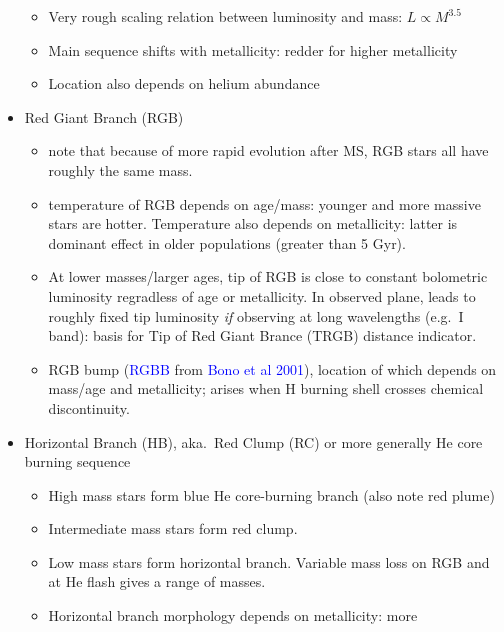 \documentclass{article}
\begin{document}
\begin{itemize}
        \begin{itemize}
            \item Very rough scaling relation between luminosity and mass:
                $ L \propto M^{3.5} $
            \item Main sequence shifts with metallicity: redder for
                higher metallicity
            \item Location also depends on helium abundance
        \end{itemize}
    \item Red Giant Branch (RGB)
        \begin{itemize}
            \item note that because of more rapid evolution after MS,
                RGB stars all have roughly the same mass.
            \item temperature of RGB depends on age/mass: younger and more
                massive stars are hotter. Temperature also depends on
                metallicity: latter is dominant effect in older populations
                (greater than 5 Gyr).
            \item At lower masses/larger ages, tip of RGB is close to
                constant bolometric luminosity regradless of age or
                metallicity. In observed plane, leads to roughly fixed
                tip luminosity \emph{if} observing at long wavelengths
                (e.g.\ I band): basis for Tip of Red Giant Brance (TRGB)
                distance indicator.
            \item RGB bump (\textcolor{blue}{RGBB} from
                \textcolor{blue}{Bono et al 2001}),
                location of which depends on mass/age and metallicity;
                arises when H burning shell crosses chemical discontinuity.
        \end{itemize}
    \item Horizontal Branch (HB), aka.\ Red Clump (RC) or more generally
        He core burning sequence
        \begin{itemize}
            \item High mass stars form blue He core-burning branch
                (also note red plume)
            \item Intermediate mass stars form red clump.
            \item Low mass stars form horizontal branch. Variable mass loss
                on RGB and at He flash gives a range of masses.
            \item Horizontal branch morphology depends on metallicity: more

\end{itemize}
\end{itemize}
\end{document}
